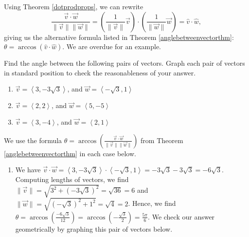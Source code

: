 \documentclass{ximera}
\begin{document}
 

Using Theorem \ref{dotprodprops}, we can rewrite \[ \frac{\overrightarrow{v} \cdot \overrightarrow{w}}{\| \overrightarrow{v} \| \|\overrightarrow{w} \|} = \left(\frac{1}{\|\overrightarrow{v}\|} \overrightarrow{v}\right) \cdot \left(\frac{1}{\|\overrightarrow{w}\|} \overrightarrow{w}\right) = \hat{v} \cdot \hat{w},\]  giving us the alternative formula listed in Theorem \ref{anglebetweenvectorthm}:  $\theta = \arccos(\hat{v} \cdot \hat{w})$.    We are overdue for an example.

 

\begin{example} \label{anglebetweenvectorex}  Find the angle between the following pairs of vectors.  Graph each pair of vectors in standard position to check the reasonableness of your answer.
\begin{enumerate}

\item  \label{anglebetweenvectorexone} $\overrightarrow{v} = \left< 3, -3\sqrt{3} \right>$, and $\overrightarrow{w} = \left<-\sqrt{3}, 1 \right>$

\item  \label{anglebetweenvectorextwo} $\overrightarrow{v} = \left< 2, 2 \right>$, and $\overrightarrow{w} = \left<5, -5\right>$

\item \label{anglebetweenvectorexthree} $\overrightarrow{v} = \left< 3, -4 \right>$, and $\overrightarrow{w} = \left<2, 1\right>$

\end{enumerate}

\begin{explanation}
We use the formula $\theta = \arccos\left( \frac{\overrightarrow{v} \cdot \overrightarrow{w}}{\| \overrightarrow{v} \| \|\overrightarrow{w} \|}\right)$ from Theorem \ref{anglebetweenvectorthm} in each case below.

\begin{enumerate}

\item  We have $\overrightarrow{v} \cdot \overrightarrow{w} = \left< 3, -3\sqrt{3} \right> \cdot \left<-\sqrt{3}, 1 \right> = -3\sqrt{3} - 3\sqrt{3} = -6\sqrt{3}$.  Computing lengths of vectors, we find  $\| \overrightarrow{v} \| = \sqrt{3^2+(-3\sqrt{3})^2} = \sqrt{36} =6$ and $\| \overrightarrow{w}\| = \sqrt{(-\sqrt{3})^2+1^2} = \sqrt{4} =2$.  Hence,  we find $\theta = \arccos\left(\frac{-6\sqrt{3}}{12}\right) = \arccos\left(-\frac{\sqrt{3}}{2}\right) = \frac{5\pi}{6}$.  We check our answer geometrically by graphing this pair of vectors below.


\end{enumerate}
\end{explanation}
\end{example}
\end{document}
